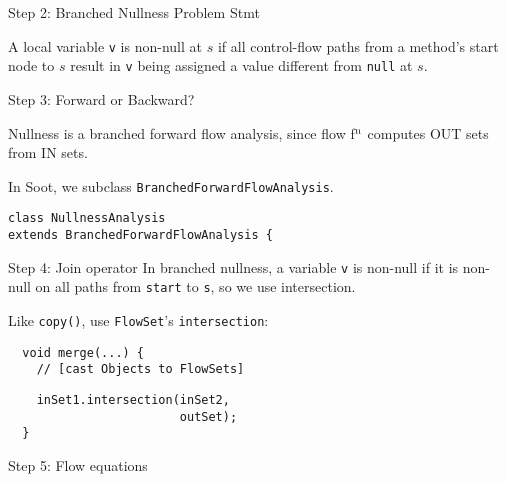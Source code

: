 \begin{slide}{Step 2: Branched Nullness Problem Stmt}

A local variable {\tt v} is {\red non-null} at $s$ if all control-flow
paths from a method's start node to $s$ result in {\tt v} being
assigned a value different from {\tt null} at $s$.

\begin{center}

\end{center}

\end{slide}

\begin{slide}{Step 3: Forward or Backward?}

Nullness is a branched forward flow analysis, since flow
f$^{\mbox{\scriptsize n}}$ computes {\sf OUT} sets from {\sf IN} sets.

\qquad

In Soot, we subclass {\tt \red BranchedForwardFlowAnalysis}.

\qquad

{\small \red \tt class NullnessAnalysis \\ 
           \qquad extends BranchedForwardFlowAnalysis \{ }
\end{slide}

\begin{slide}{Step 4: Join operator}
In branched nullness, a variable {\tt v} is non-null if it is non-null
on all paths from {\tt start} to {\tt s}, so we use intersection.

\qquad

Like {\tt copy()}, use {\tt FlowSet}'s {\tt intersection}:

\vspace*{0.05in}

\begin{verbatim}
  void merge(...) {
    // [cast Objects to FlowSets]
\end{verbatim}
{\red\verb+    inSet1.intersection(inSet2,+\\
     \verb+                        outSet);+}\\
\verb+  }+

\end{slide}


\begin{slide}{Step 5: Flow equations}
\vspace*{-0.1in}

\end{slide}

